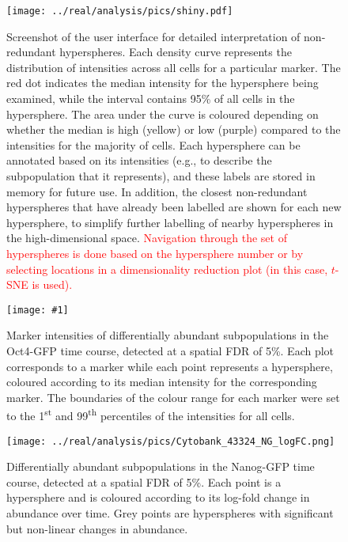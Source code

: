 \documentclass{article}
\newcommand\revised[1]{\textcolor{red}{#1}}
\begin{document}
\begin{figure}[tbp]
    \begin{center}
        \texttt{[image: ../real/analysis/pics/shiny.pdf]}
    \end{center}
    \caption{Screenshot of the user interface for detailed interpretation of non-redundant hyperspheres.
            Each density curve represents the distribution of intensities across all cells for a particular marker.
            The red dot indicates the median intensity for the hypersphere being examined, while the interval contains 95\% of all cells in the hypersphere.
            The area under the curve is coloured depending on whether the median is high (yellow) or low (purple) compared to the intensities for the majority of cells.
            Each hypersphere can be annotated based on its intensities (e.g., to describe the subpopulation that it represents), and these labels are stored in memory for future use.
            In addition, the closest non-redundant hyperspheres that have already been labelled are shown for each new hypersphere, to simplify further labelling of nearby hyperspheres in the high-dimensional space.
            \revised{Navigation through the set of hyperspheres is done based on the hypersphere number or by selecting locations in a dimensionality reduction plot (in this case, $t$-SNE is used).}
}
\label{fig:shiny}
\end{figure}

\clearpage
\newcommand{\bigfigopt}[1]{\texttt{[image: \#1]}}

\begin{figure}[p]
    \begin{center}
    \bigfigopt{../real/analysis/pics/Cytobank_43324_4FI_markers.png}
    \end{center}
    \caption{
        Marker intensities of differentially abundant subpopulations in the Oct4-GFP time course, detected at a spatial FDR of 5\%.
        Each plot corresponds to a marker while each point represents a hypersphere, coloured according to its median intensity for the corresponding marker.
        The boundaries of the colour range for each marker were set to the 1\textsuperscript{st} and 99\textsuperscript{th} percentiles of the intensities for all cells.
    }
    \label{fig:oct4_markers}
\end{figure}

\begin{figure}[p]
    \begin{center}
    \texttt{[image: ../real/analysis/pics/Cytobank\_43324\_NG\_logFC.png]}
    \end{center}
    \caption{
        Differentially abundant subpopulations in the Nanog-GFP time course, detected at a spatial FDR of 5\%.
        Each point is a hypersphere and is coloured according to its log-fold change in abundance over time.
        Grey points are hyperspheres with significant but non-linear changes in abundance.
    }
\end{figure}
\end{document}
